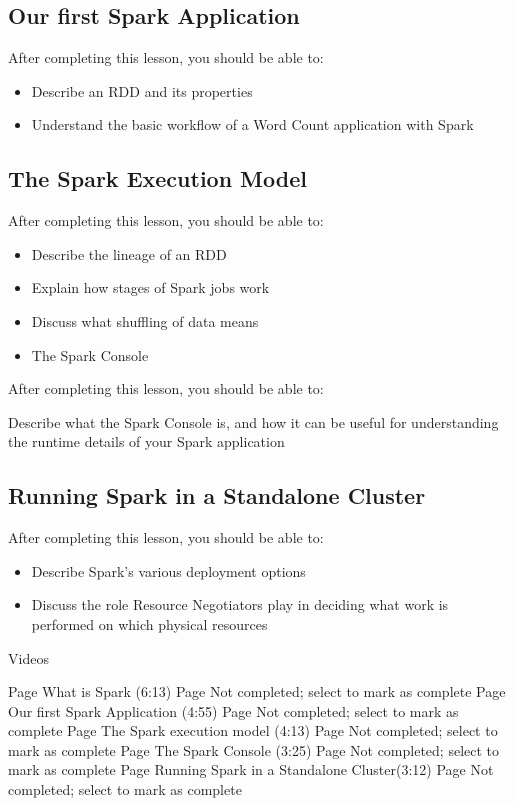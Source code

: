 \subsection{Our first Spark Application}
After completing this lesson, you should be able to:

\begin{itemize}
\item Describe an RDD and its properties
\item Understand the basic workflow of a Word Count application with Spark
\end{itemize}

\subsection{The Spark Execution Model}

After completing this lesson, you should be able to:

\begin{itemize}
\item Describe the lineage of an RDD
\item Explain how stages of Spark jobs work
\item Discuss what shuffling of data means
\item The Spark Console
\end{itemize}
After completing this lesson, you should be able to:

Describe what the Spark Console is, and how it can be useful for understanding the runtime details of your Spark application

\subsection{Running Spark in a Standalone Cluster}

After completing this lesson, you should be able to:

\begin{itemize}
\item Describe Spark’s various deployment options
\item Discuss the role Resource Negotiators play in deciding what work is performed on which physical resources
\end{itemize}
Videos

Page What is Spark (6:13) Page Not completed; select to mark as complete
Page Our first Spark Application (4:55) Page Not completed; select to mark as complete
Page The Spark execution model (4:13) Page Not completed; select to mark as complete
Page The Spark Console (3:25) Page Not completed; select to mark as complete
Page Running Spark in a Standalone Cluster(3:12) Page Not completed; select to mark as complete

